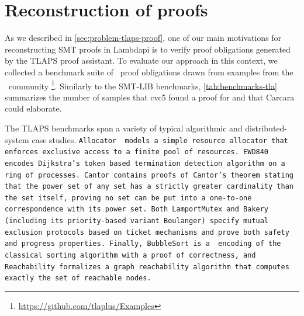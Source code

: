 \section{Reconstruction of \texorpdfstring{\tlaplus}{TLA+} proofs}
\label{sec:evaluation-tlaplus}

As we described in \cref{sec:problem-tlaps-proof}, one of our main motivations for reconstructing SMT proofs in Lambdapi is to verify proof obligations generated by the TLAPS proof assistant.
To evaluate our approach in this context, we collected a benchmark suite of \tlaplus\ proof obligations drawn from examples from the \tlaplus\ community \footnote{\url{https://github.com/tlaplus/Examples}}.
Similarly to the SMT-LIB benchmarks, \cref{tab:benchmarks-tla} summarizes the number of samples that cvc5 found a proof for and that Carcara could elaborate.

The TLAPS benchmarks span a variety of typical algorithmic and distributed-system case studies.
\tt{Allocator} \cite{allocator} models a simple resource allocator that enforces exclusive access to a finite pool of resources.
\tt{EWD840} \cite{ewd840} encodes Dijkstra's token based termination detection algorithm on a ring of processes.
\tt{Cantor} contains proofs of Cantor’s theorem stating that the power set of any set has a strictly greater cardinality than the set itself,
proving no set can be put into a one-to-one correspondence with its power set.
Both \tt{LamportMutex} and \tt{Bakery} (including its priority-based variant \tt{Boulanger}) specify mutual exclusion protocols based on ticket mechanisms and prove both safety and progress properties.
Finally, \tt{BubbleSort} is a \tlaplus\ encoding of the classical sorting algorithm with a proof of correctness, and Reachability formalizes a graph reachability algorithm that computes exactly the set of reachable nodes.

\begin{table}[t]
\centering
\caption{
  Summary of benchmark.\\
  The format $S-F-T$ indicates respectively the number of success (S), failed (F) and timeout (T) samples.
}
{%
\scriptsize
{}%
}

\label{tab:benchmarks-tla}
\end{table}

